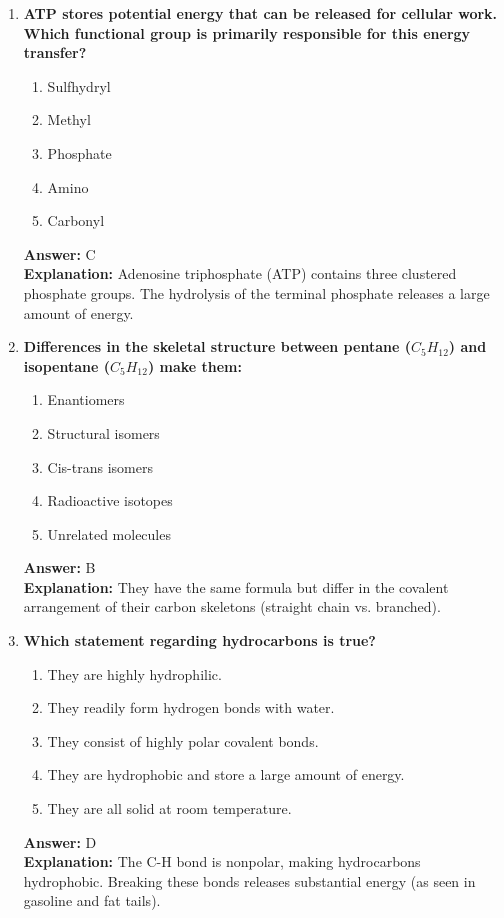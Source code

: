 \documentclass[11pt, a4paper]{article}
\begin{document}
\begin{enumerate}
\item \textbf{ATP stores potential energy that can be released for cellular work. Which functional group is primarily responsible for this energy transfer?}
\begin{enumerate}[label=\Alph*.]
    \item Sulfhydryl
    \item Methyl
    \item Phosphate
    \item Amino
    \item Carbonyl
\end{enumerate}
\textbf{Answer:} C \\
\textbf{Explanation:} Adenosine triphosphate (ATP) contains three clustered phosphate groups. The hydrolysis of the terminal phosphate releases a large amount of energy.

\item \textbf{Differences in the skeletal structure between pentane ($C_5H_{12}$) and isopentane ($C_5H_{12}$) make them:}
\begin{enumerate}[label=\Alph*.]
    \item Enantiomers
    \item Structural isomers
    \item Cis-trans isomers
    \item Radioactive isotopes
    \item Unrelated molecules
\end{enumerate}
\textbf{Answer:} B \\
\textbf{Explanation:} They have the same formula but differ in the covalent arrangement of their carbon skeletons (straight chain vs. branched).

\item \textbf{Which statement regarding hydrocarbons is true?}
\begin{enumerate}[label=\Alph*.]
    \item They are highly hydrophilic.
    \item They readily form hydrogen bonds with water.
    \item They consist of highly polar covalent bonds.
    \item They are hydrophobic and store a large amount of energy.
    \item They are all solid at room temperature.
\end{enumerate}
\textbf{Answer:} D \\
\textbf{Explanation:} The C-H bond is nonpolar, making hydrocarbons hydrophobic. Breaking these bonds releases substantial energy (as seen in gasoline and fat tails).


\end{enumerate}
\end{document}
